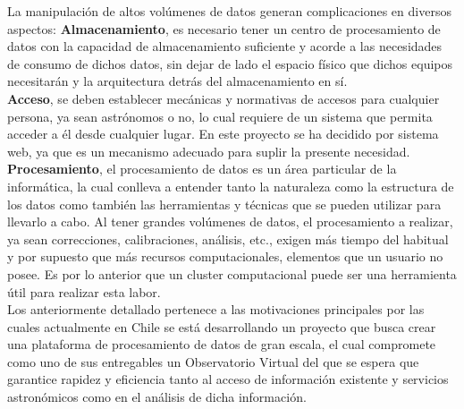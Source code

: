 La manipulación de altos volúmenes de datos generan complicaciones en diversos
aspectos:
	\textbf{Almacenamiento}, es necesario tener un centro de procesamiento de datos con
		la capacidad de almacenamiento suficiente y acorde a las necesidades de consumo
		de dichos datos, sin dejar de lado el espacio físico que dichos equipos
		necesitarán y la arquitectura detrás del almacenamiento en sí. \\
	\textbf{Acceso}, se deben establecer mecánicas y normativas de accesos para
		cualquier persona, ya sean astrónomos o no, lo cual requiere de un sistema que
                permita acceder a él desde cualquier lugar. En este proyecto
		se ha decidido por sistema web, ya que es un mecanismo adecuado para suplir la
                presente necesidad. \\
	\textbf{Procesamiento}, el procesamiento de datos es un área particular de la
		informática, la cual conlleva a entender tanto la naturaleza como la estructura
		de los datos como también las herramientas y técnicas que se pueden utilizar
		para llevarlo a cabo. Al tener grandes volúmenes de datos, el procesamiento a
		realizar, ya sean correcciones, calibraciones, análisis, etc., exigen más tiempo
		del habitual y por supuesto que más recursos computacionales, elementos que un
		usuario no posee. Es por lo anterior que un cluster computacional puede ser una
		herramienta útil para realizar esta labor. \\

Los anteriormente detallado pertenece a las motivaciones principales
por las cuales actualmente en Chile se está desarrollando un proyecto que
busca crear una plataforma de procesamiento de datos de gran escala, el cual
compromete como uno de sus entregables un Observatorio Virtual del que se
espera que garantice rapidez y eficiencia tanto al acceso de información
existente y servicios astronómicos como en el análisis de dicha información.

